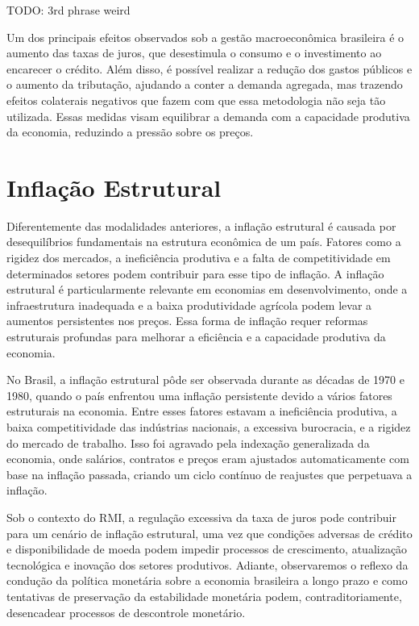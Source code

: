\documentclass[12pt,oneside,a4paper,chapter=TITLE,english,brazil,sumario=abnt-6027-2012]{abntex2}
\begin{document}
TODO: 3rd phrase weird

Um dos principais efeitos observados sob a gestão macroeconômica brasileira é o aumento das taxas de juros, que desestimula o consumo e o investimento ao encarecer o crédito. Além disso, é possível realizar a redução dos gastos públicos e o aumento da tributação, ajudando a conter a demanda agregada, mas trazendo efeitos colaterais negativos que fazem com que essa metodologia não seja tão utilizada. Essas medidas visam equilibrar a demanda com a capacidade produtiva da economia, reduzindo a pressão sobre os preços.

\section{Inflação Estrutural}

Diferentemente das modalidades anteriores, a inflação estrutural é causada por desequilíbrios fundamentais na estrutura econômica de um país. Fatores como a rigidez dos mercados, a ineficiência produtiva e a falta de competitividade em determinados setores podem contribuir para esse tipo de inflação. A inflação estrutural é particularmente relevante em economias em desenvolvimento, onde a infraestrutura inadequada e a baixa produtividade agrícola podem levar a aumentos persistentes nos preços. Essa forma de inflação requer reformas estruturais profundas para melhorar a eficiência e a capacidade produtiva da economia.

No Brasil, a inflação estrutural pôde ser observada durante as décadas de 1970 e 1980, quando o país enfrentou uma inflação persistente devido a vários fatores estruturais na economia. Entre esses fatores estavam a ineficiência produtiva, a baixa competitividade das indústrias nacionais, a excessiva burocracia, e a rigidez do mercado de trabalho. Isso foi agravado pela indexação generalizada da economia, onde salários, contratos e preços eram ajustados automaticamente com base na inflação passada, criando um ciclo contínuo de reajustes que perpetuava a inflação.

Sob o contexto do RMI, a regulação excessiva da taxa de juros pode contribuir para um cenário de inflação estrutural, uma vez que condições adversas de crédito e disponibilidade de moeda podem impedir processos de crescimento, atualização tecnológica e inovação dos setores produtivos. Adiante, observaremos o reflexo da condução da política monetária sobre a economia brasileira a longo prazo e como tentativas de preservação da estabilidade monetária podem, contraditoriamente, desencadear processos de descontrole monetário.
\end{document}
